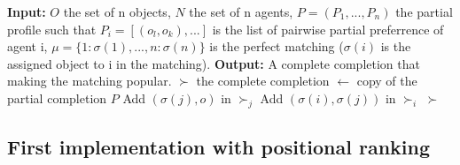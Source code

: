 \documentclass{article}
\begin{document}
\begin{algorithm}[H]
\caption{FindPossiblyPopularMatching}
\begin{algorithmic}[1]
    \State \textbf{Input:} $O$ the set of n objects, $N$ the set of n agents, $P = (P_1, ..., P_n)$ the partial profile such that $P_i = [(o_l, o_k), ...]$ is the list of pairwise partial preferrence of agent i, $\mu = \{1\colon \sigma(1), ..., n\colon \sigma(n)\}$ is the perfect matching ($\sigma(i)$ is the assigned object to i in the matching). 
    \State \textbf{Output:} A complete completion that making the matching popular.
    \State $\succ$ the complete completion $\leftarrow$ copy of the partial completion $P$
                        \State Add $(\sigma(j), o)$ in $\succ_j$
                    \EndIf
                \EndFor
                \State Add $(\sigma(i), \sigma(j))$ in $\succ_i$
           \EndIf
        \EndFor
    \EndFor
    \State \Return $\succ$
\end{algorithmic}
\end{algorithm}

\subsection{First implementation with positional ranking}
\end{document}
